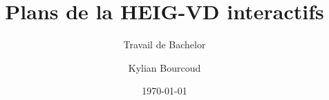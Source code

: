 \author{Kylian Bourcoud}


\title{Plans de la HEIG-VD interactifs}

\subtitle{Travail de Bachelor}


\date{\today}


